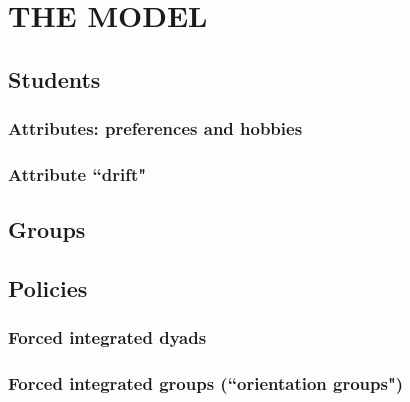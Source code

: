 
\section{THE MODEL}
\label{sec:model}

\subsection{Students}


\subsubsection{Attributes: preferences and hobbies}

\subsubsection{Attribute ``drift"}

\subsection{Groups}

\subsection{Policies}

\subsubsection{Forced integrated dyads}

\subsubsection{Forced integrated groups (``orientation groups")}

